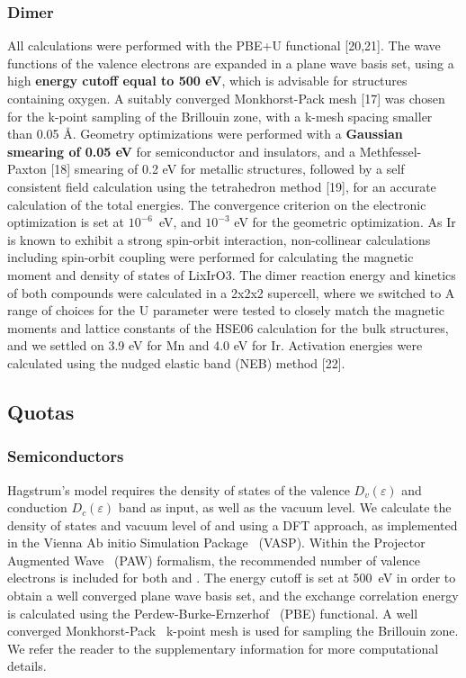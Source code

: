 \begin{refsection}
\subsubsection{Dimer} \label{appendix:sec-dimer}
All calculations were performed with the PBE+U functional [20,21]. The wave functions of the valence electrons are expanded in a plane wave basis set, using a high \textbf{energy cutoff equal to 500 eV}, which is advisable for structures containing oxygen. A suitably converged Monkhorst-Pack mesh [17] was chosen for the k-point sampling of the Brillouin zone, with a k-mesh spacing smaller than 0.05 \AA. Geometry optimizations were performed with a \textbf{Gaussian smearing of 0.05 eV} for semiconductor and insulators, and a Methfessel-Paxton [18] smearing of 0.2 eV for metallic structures, followed by a self consistent field calculation using the tetrahedron method [19], for an accurate calculation of the total energies. The convergence criterion on the electronic optimization is set at $10^{-6}$~eV, and $10^{-3}$ eV for the geometric optimization. As Ir is known to exhibit a strong spin-orbit interaction, non-collinear calculations including spin-orbit coupling were performed for calculating the magnetic moment and density of states of LixIrO3. The dimer reaction energy and kinetics of both compounds were calculated in a 2x2x2 supercell, where we switched to  A range of choices for the U parameter were tested to closely match the magnetic moments and lattice constants of the HSE06 calculation for the bulk structures, and we settled on 3.9 eV for Mn and 4.0 eV for Ir. Activation energies were calculated using the nudged elastic band (NEB) method [22]. 

\subsection{Quotas} \label{appendix:sec-quotas}

\subsubsection{Semiconductors} \label{appendix:sec-semiconductors}

Hagstrum's model requires the density of states of the valence $D_v(\varepsilon)$ and conduction $D_c(\varepsilon)$ band as input, as well as the vacuum level. We calculate the density of states and vacuum level of  and  using a DFT approach, as implemented in the Vienna Ab initio Simulation Package~\cite{Kresse1993, Kresse1994, Kresse1996, Kresse1996} (VASP). Within the Projector Augmented Wave~\cite{Blochl1994, Kresse1999} (PAW) formalism, the recommended number of valence electrons is included for both  and . The energy cutoff is set at 500~\si{\electronvolt} in order to obtain a well converged plane wave basis set, and the exchange correlation energy is calculated using the Perdew-Burke-Ernzerhof~\cite{Perdew1996} (PBE) functional. A well converged Monkhorst-Pack~\cite{Monkhorst1976} k-point mesh is used for sampling the Brillouin zone. We refer the reader to the supplementary information for more computational details.\\


\end{refsection}
